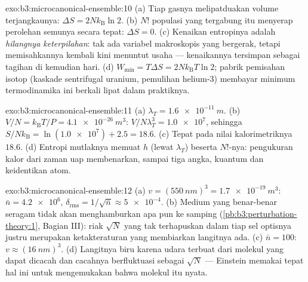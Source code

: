 \begin{solution}{exo:b3:microcanonical-ensemble:10}
(a) Tiap gasnya melipatduakan volume terjangkaunya: $\Delta S =
2Nk_{\text{B}}\ln2$. (b) $N!$ populasi yang tergabung itu menyerap
perolehan semunya secara tepat: $\Delta S = 0$. (c) Kenaikan entropinya
adalah \emph{hilangnya keterpilahan}: tak ada variabel makroskopis yang
bergerak, tetapi memisahkannya kembali kini menuntut usaha --- kenaikannya
tersimpan sebagai tagihan di kemudian hari. (d) $W_{\min} = T\Delta S =
2Nk_{\text{B}}T\ln2$; pabrik pemisahan isotop (kaskade sentrifugal
uranium, pemulihan helium-3) membayar minimum termodinamika ini berkali
lipat dalam praktiknya.
\end{solution}

\begin{solution}{exo:b3:microcanonical-ensemble:11}
(a) $\lambda_T = \qty{1.6e-11}{m}$. (b) $V/N = k_{\text{B}}T/P =
\qty{4.1e-26}{m^3}$: $V/N\lambda_T^3 = \num{1.0e7}$, sehingga
$S/Nk_{\text{B}} = \ln(\num{1.0e7}) + 2.5 = 18.6$. (c) Tepat pada nilai
kalorimetriknya $18.6$. (d) Entropi mutlaknya memuat $h$
(lewat $\lambda_T$) beserta $N!$-nya: pengukuran kalor dari zaman uap
membenarkan, sampai tiga angka, kuantum  dan keidentikan atom.
\end{solution}

\begin{solution}{exo:b3:microcanonical-ensemble:12}
(a) $v = (\qty{550}{nm})^3 = \qty{1.7e-19}{m^3}$: $\bar n =
\num{4.2e6}$, $\delta_{\text{rms}} = 1/\sqrt{\bar n} \approx
\num{5e-4}$. (b) Medium yang benar-benar seragam tidak akan
menghamburkan apa pun ke samping
(\cref{pb:b3:perturbation-theory:1}, Bagian III): riak $\sqrt N$ yang tak
terhapuskan dalam tiap sel optisnya justru merupakan ketakteraturan yang
membiarkan langitnya ada. (c) $\bar n = 100$: $v
\approx (\qty{16}{nm})^3$. (d) Langitnya biru karena udara terbuat dari
molekul yang dapat dicacah dan cacahnya berfluktuasi sebagai $\sqrt N$ ---
Einstein memakai tepat hal ini untuk mengemukakan bahwa molekul itu nyata.
\end{solution}

